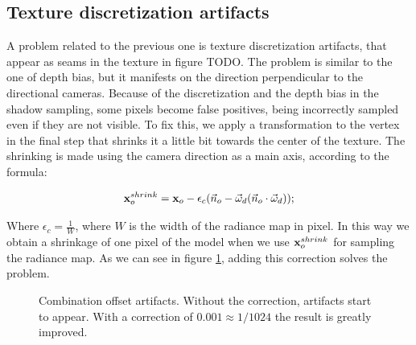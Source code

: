 \subsection{Texture discretization artifacts}
A problem related to the previous one is texture discretization artifacts, that appear as seams in the texture in figure TODO. The problem is similar to the one of depth bias, but it manifests on the direction perpendicular to the directional cameras. Because of the discretization and the depth bias in the shadow sampling, some pixels become false positives, being incorrectly sampled even if they are not visible. To fix this, we apply a transformation to the vertex in the final step that shrinks it a little bit towards the center of the texture. The shrinking is made using the camera direction as a main axis, according to the formula:

$$
\mathbf{x}_o^{shrink} = \mathbf{x}_o - \epsilon_c (\vec{n}_o - \vec{\omega}_d (\vec{n}_o \cdot \vec{\omega}_d));
$$

Where $\epsilon_c = \frac{1}{W}$, where $W$ is the width of the radiance map in pixel. In this way we obtain a shrinkage of one pixel of the model when we use $\mathbf{x}_o^{shrink}$ for sampling the radiance map. As we can see in figure \ref{fig:combias}, adding this correction solves the problem.

\begin{figure}
\centering
{}
\caption{Combination offset artifacts. Without the correction, artifacts start to appear. With a correction of $0.001 \approx 1 / 1024$ the result is greatly improved.}
\label{fig:combias}
\end{figure}


